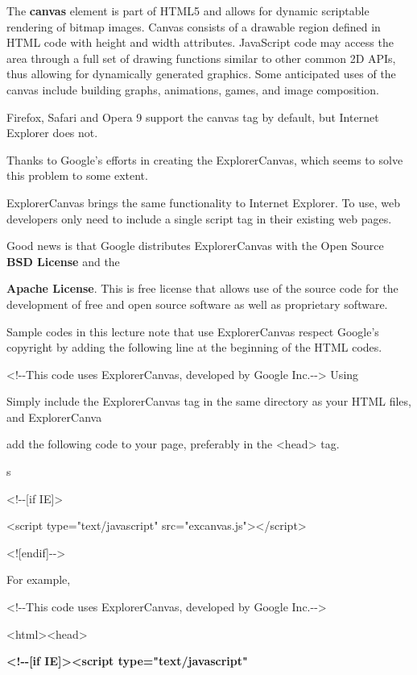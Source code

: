 \documentclass[
]{article}
\begin{document}
The \textbf{canvas} element is part of HTML5 and allows for dynamic
scriptable rendering of bitmap images. Canvas consists of a drawable
region defined in HTML code with height and width attributes. JavaScript
code may access the area through a full set of drawing functions similar
to other common 2D APIs, thus allowing for dynamically generated
graphics. Some anticipated uses of the canvas include building graphs,
animations, games, and image composition.

Firefox, Safari and Opera 9 support the canvas tag by default, but
Internet Explorer does not.

Thanks to Google's efforts in creating the ExplorerCanvas, which seems
to solve this problem to some extent.

ExplorerCanvas brings the same functionality to Internet Explorer. To
use, web developers only need to include a single script tag in their
existing web pages.

Good news is that Google distributes ExplorerCanvas with the Open Source
\textbf{BSD License} and the \textbf{}

\textbf{Apache License}. This is free license that allows use of the
source code for the development of free and open source software as well
as proprietary software.

Sample codes in this lecture note that use ExplorerCanvas respect
Google's copyright by adding the following line at the beginning of the
HTML codes. \textbf{}

\textless!-\/-This code uses ExplorerCanvas, developed by Google
Inc.-\/-\textgreater{} Using

Simply include the ExplorerCanvas tag in the same directory as your HTML
files, and ExplorerCanva

add the following code to your page, preferably in the
\textless head\textgreater{} tag.

s

\textless!-\/-{[}if IE{]}\textgreater{}

\textless script type="text/javascript"
src="excanvas.js"\textgreater\textless/script\textgreater{}

\textless!{[}endif{]}-\/-\textgreater{}

For example,

\textless!-\/-This code uses ExplorerCanvas, developed by Google
Inc.-\/-\textgreater{}

\textless html\textgreater\textless head\textgreater{}

\textbf{\textless!-\/-{[}if IE{]}\textgreater\textless script
type="text/javascript"}
\end{document}

